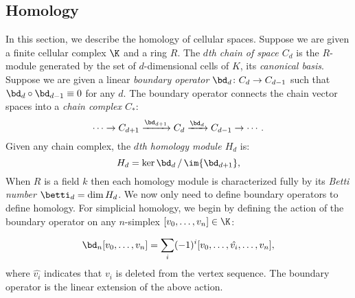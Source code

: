 \subsection{Homology}
In this section, we describe the homology of cellular spaces. 
Suppose we are given a finite cellular complex $\K$ and a ring $R$. 
The \emph{$d$th chain of space $C_d$} is the $R$-module generated by 
the set of $d$-dimensional cells of $K$, its \emph{canonical basis}.  
Suppose we are given a linear \emph{boundary operator} 
$\bd_d\colon C_d \rightarrow C_{d-1}$ such that 
$\bd_d \circ \bd_{d-1} \equiv 0$ for any $d$.  
The boundary operator connects the chain vector spaces into a 
\emph{chain complex $C_*$}:
\begin{equation*}
  \cdots \rightarrow             C_{d+1}
         \xrightarrow{\bd_{d+1}}  C_d
         \xrightarrow{\bd_d}     C_{d-1}
         \rightarrow \cdots .
\label{eqn:chaincomplex}
\end{equation*}
Given any chain complex, the \emph{$d$th homology module $H_d$} is:
\begin{equation}
  \label{eqn:homology}
  H_d = {\ker{\bd_d}}\,/\,{\im{\bd_{d+1}}}, 
\end{equation}
When $R$ is a field $k$ then each homology module is characterized fully by its \emph{Betti number}
$\betti_d = \dim{H_d}$. 
We now only need to define boundary operators to define homology. 
For simplicial homology, we begin by defining the action of the boundary operator on any
$n$-simplex $[v_0,\ldots,v_n] \in \K$:

\begin{equation*}
\bd_n [v_0,\ldots,v_n] = \sum_i (-1)^i [v_0,\ldots,\hat{v_i},\ldots,v_n],
\end{equation*}
where $\hat{v_i}$ indicates that $v_i$ is deleted from the vertex 
sequence. The boundary operator is the linear extension of the above action.

